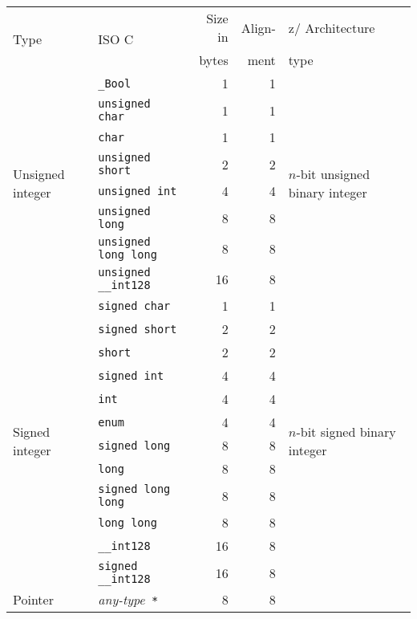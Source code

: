 \documentclass[english,11pt,twoside,toc=bib,toc=idx]{scrreprt}
\newcommand{\NBYTES}{8}
\newcommand{\ARCH}{z/\kern-1pt Ar\-chi\-tec\-ture}
\newcommand{\NBYTES}{4}
\newcommand{\ARCH}{ESA/390}
\newenvironment{DIFnomarkup}{}{} %
\begin{document}
\begin{table}
  \centering
  \begin{DIFnomarkup}
  \begin{threeparttable}
    \begin{tabularx}{\textwidth}{XlrrX}
      \toprule
      \multirow{2}{*}{Type}
      & \multirow{2}{*}{ISO C}
      & Size in & Align- & \ARCH{} \\
      &
      & bytes   & ment   & type \\
      \midrule
      \multirow{8}{\hsize}{Unsigned integer}
      & \texttt{\_Bool} & 1 & 1
      & \multirow{8}{\hsize}{$n$-bit unsigned binary integer\tnote{\dagger}}
      \\
      & \texttt{unsigned char} & 1 & 1 \\
      & \texttt{char} & 1 & 1 \\
      & \texttt{unsigned short} & 2 & 2 \\
      & \texttt{unsigned int} & 4 & 4 \\
      & \texttt{unsigned long} & \NBYTES{} & \NBYTES{} \\
      & \texttt{unsigned long long} & 8 & 8 \\
      & \texttt{unsigned \_\_int128}\tnote{\dagger\dagger} & 16 & 8 \\
      \midrule
      \multirow{12}{\hsize}{Signed integer}
      & \texttt{signed char} & 1 & 1
      & \multirow{12}{\hsize}{$n$-bit signed binary integer\tnote{\dagger}}
      \\
      & \texttt{signed short} & 2 & 2 \\
      & \texttt{short} & 2 & 2 \\
      & \texttt{signed int} & 4 & 4 \\
      & \texttt{int} & 4 & 4 \\
      & \texttt{enum} & 4 & 4 \\
      & \texttt{signed long} & \NBYTES{} & \NBYTES{} \\
      & \texttt{long} & \NBYTES{} & \NBYTES{} \\
      & \texttt{signed long long} & 8 & 8 \\
      & \texttt{long long} & 8 & 8 \\
      & \texttt{\_\_int128}\tnote{\dagger\dagger} & 16 & 8 \\
      & \texttt{signed \_\_int128}\tnote{\dagger\dagger} & 16 & 8 \\
      \midrule
      \multirow{2}{\hsize}{Pointer}
      & \textit{any-type}\texttt{ *} & \NBYTES{} & \NBYTES{}

\end{tabularx}
\end{threeparttable}
\end{DIFnomarkup}
\end{table}
\end{document}
